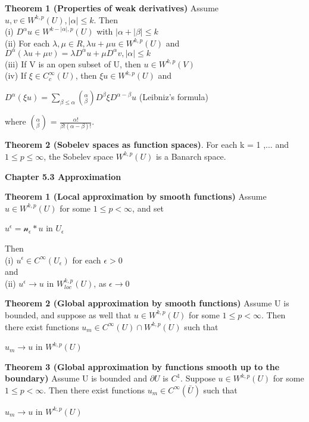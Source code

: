 \documentclass{article}
\newcommand\tab[1][1cm]{\hspace*{#1}}
\begin{document}
\textbf {{Theorem 1 (Properties of weak derivatives)}}
 Assume $u, v \in W^{k,p}(U), |\alpha| \leq k$. Then \\
\tab (i) $D^\alpha u \in W^{k-|\alpha|,p}(U)$ with $|\alpha + |\beta| \leq k$ \\
(ii) For each $\lambda, \mu \in R, \lambda u + \mu u \in W^{k,p}(U)$ and $D^{\alpha} ( \lambda u + \mu v) = \lambda D^{\alpha} u + \mu D^{\alpha} v, |\alpha| \leq k$ \\
(iii) If V is an open subset of U, then $u \in W^{k,p}(V)$ \\
(iv) If $\xi \in C_c^\infty (U)$, then $\xi u \in W^{k,p} (U)$ and
\begin{center}
$D^{\alpha} ( \xi u) = \sum_{\beta \leq \alpha} (_\beta^\alpha) D^{\beta}  \xi D^{\alpha - \beta} u$ (Leibniz's formula)
\end{center}
where $(^\alpha_\beta)$ = $\frac{\alpha !}{\beta ! (\alpha - \beta)!}.$

\textbf {Theorem 2 (Sobelev spaces as function spaces)}. For each k = 1 ,... and $1 \leq p \leq \infty$, the Sobelev space $W^{k,p}(U)$ is a Banarch space.

\textbf {Chapter 5.3 Approximation}

\textbf {Theorem 1 (Local approximation by smooth functions)} Assume $u \in W^{k,p}(U)$ for some $1 \leq p < \infty$, and set
\begin{center}
$u^{\epsilon} = \mathcal{n}_\epsilon * u$ \tab in $U_{\epsilon}$
\end{center}
Then \\
\tab (i) $u^\epsilon \in C^{\infty}(U_{\epsilon})$ \tab for each $\epsilon > 0$ \\
and \\
\tab (ii) $u^{\epsilon} \to u$ \tab in $W^{k,p}_{loc} (U)$, as $\epsilon \to 0$

\textbf {Theorem 2 (Global approximation by smooth functions)} Assume U is bounded, and suppose as well that $u \in W^{k,p}(U)$ for some $1 \leq p < \infty$. Then there exist functions $u_m \in C^{\infty} (U) \cap W^{k,p} (U)$ such that 
 \begin{center}
$u_m \to u$ \tab in $W^{k,p}(U)$
\end{center}

\textbf {Theorem 3 (Global approximation by functions smooth up to the boundary)} Assume U is bounded and $\partial U$ is $C^1$. Suppose $u \in W^{k,p}(U)$ for some $1 \leq p < \infty$. Then there exist functions $u_m \in C^{\infty} (\bar{U})$ such that
 \begin{center}
$u_m \to u$ \tab in $W^{k,p} (U)$
\end{center}
\end{document}
